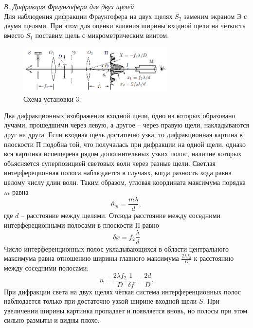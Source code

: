 \documentclass[a4paper, 12pt]{article}%
\begin{document}
 
	 \textit{В. Дифракция Фраунгофера для двух щелей}\\
	 
	 Для наблюдения дифракции Фраунгофера на двух щелях $S_2$ заменим экраном Э с двумя щелями. При этом для оценки влияния ширины входной щели на чёткость вместо $S_1$ поставим щель с микрометрическим винтом.
	 \begin{figure}[h]
	 	\includegraphics[width = 0.7\textwidth]{4.png}
	 	\centering
	 	\caption{Схема установки 3.}
	 \end{figure}
	 Два дифракционных изображения входной щели, одно из которых образовано лучами, прошедшими через левую, а другое -- через правую щели, накладываются друг на друга.
	 Если входная щель достаточно узка, то дифракционная картина в плоскости П подобна той, что получалась при дифракции на одной щели, однако вся картинка испещерена рядом дополнительных узких полос, наличие которых объясняется суперпозицией световых волн через разные щели. Светлая интерфереционная полоса наблюдается в случаях, когда разность хода равна целому числу длин волн. Таким образом, угловая координата максимума порядка $m$ равна
	 \begin{equation}
	 	\theta_m = \dfrac{m \lambda}{d},
	 \end{equation}
	 где $d$ -- расстояние между щелями. Отсюда расстояние между соседними интерфереционными полосами в плоскости П равно
	 \begin{equation}
	 	\delta x = f_2 \dfrac{\lambda}{d}
	 \end{equation}
	 Число интерференционных полос укладывающихся в области центрального максимума равна отношению ширины главного максимума $\frac{2\lambda f_2}{D}$ к расстоянию между соседними полосами:
	 \begin{equation}
	 	n = \dfrac{2\lambda f_2}{D} \dfrac{1}{\delta f}= \dfrac{2d}{D}.
	 \end{equation}
	 При дифракции света на двух щелях чёткая система интерференционных полос наблюдается только при достаточно узкой ширине входной щели $S$. При увеличении ширины картинка пропадает и появляется вновь, но полосы при этом сильно размыты и видны плохо.\\
	 
\end{document}
